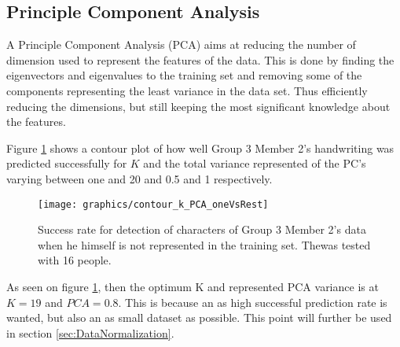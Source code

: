 \subsection{Principle Component Analysis}
A Principle Component Analysis (PCA) aims at reducing the number of dimension used to represent the features of the data.
This is done by finding the eigenvectors and eigenvalues to the training set and removing some of the components representing the least variance in the data set.
Thus efficiently reducing the dimensions, but still keeping the most significant knowledge about the features.

Figure \ref{fig:contour_KvsPCA_G3M2vsRest} shows a contour plot of how well Group 3 Member 2's  handwriting was predicted successfully for $K$ and the total variance represented of the PC's varying between one and 20 and 0.5 and 1 respectively.

\begin{figure}[H]
\centering
\texttt{[image: graphics/contour\_k\_PCA\_oneVsRest]}
\caption{Success rate for detection of characters of Group 3 Member 2's data when he himself is not represented in the training set. 
Thewas tested with 16 people.}
\label{fig:contour_KvsPCA_G3M2vsRest}
\end{figure}

As seen on figure \ref{fig:contour_KvsPCA_G3M2vsRest}, then the optimum K and represented PCA variance is at $K = 19$ and $PCA = 0.8$. 
This is because an as high successful prediction rate is wanted, but also an as small dataset as possible. 
This point will further be used in section \ref{sec:DataNormalization}.


